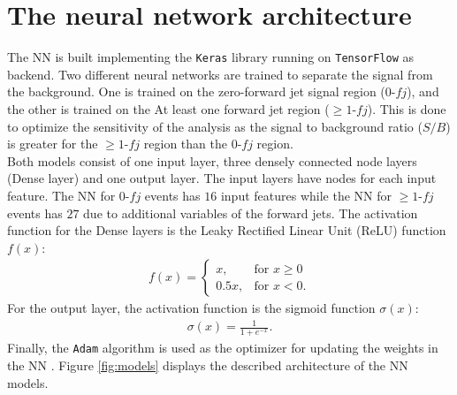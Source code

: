 \section{The neural network architecture}
\label{sec:arch}
The NN is built implementing the \texttt{Keras} \cite{Keras} library running on \texttt{TensorFlow} as backend\cite{tensorflow}.
Two different neural networks are trained to separate the signal from the background. One is trained on the zero-forward jet signal region ($0\text{-}fj$), and the other is trained on the At least one forward jet region ($\geq 1\text{-}fj$). 
This is done to optimize the sensitivity of the analysis as the signal to background ratio ($S/B$) is greater for the $\geq 1\text{-}fj$ region than the $0\text{-}fj$ region. \\
Both models consist of one input layer, three densely connected node layers (Dense layer) and one output layer. The input layers have nodes for each input feature. The NN for $0\text{-}fj$ events has $16$ input features while the NN for $\geq 1\text{-}fj$ events has $27$ due to additional variables of the forward jets. 
The activation function for the Dense layers is the Leaky Rectified Linear Unit (ReLU) function $f(x)$:
\begin{align*}
    f(x) =\begin{cases}
            x, & \text{for } x \geq 0\\
            0.5x, & \text{for } x < 0.
        \end{cases}
\end{align*}
For the output layer, the activation function is the sigmoid function $\sigma(x)$:
\begin{align*}
    \sigma(x) = \frac{1}{1+ e^{-x}}. 
\end{align*}
Finally, the \texttt{Adam} algorithm is used as the optimizer for updating the weights in the NN \cite{Adam}. Figure \ref{fig:models} displays the described architecture of the NN models. 
